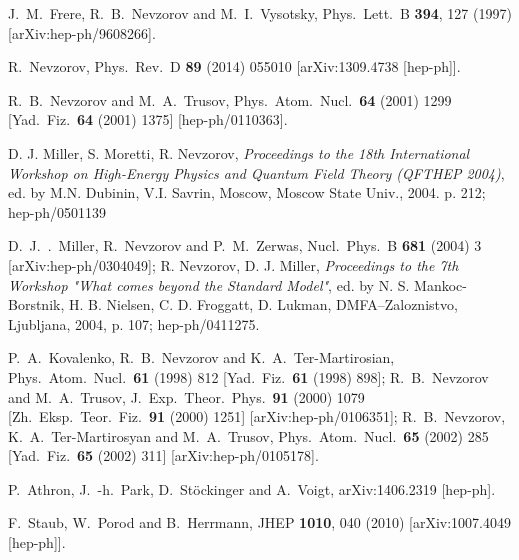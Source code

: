 \documentclass[12pt,a4paper]{article}
\begin{document}
\begin{thebibliography}{999}
J.~M.~Frere, R.~B.~Nevzorov and M.~I.~Vysotsky,
Phys.\ Lett.\  B {\bf 394}, 127 (1997)
[arXiv:hep-ph/9608266].

R.~Nevzorov,
Phys.\ Rev.\ D {\bf 89} (2014) 055010
[arXiv:1309.4738 [hep-ph]].

R.~B.~Nevzorov and M.~A.~Trusov,
Phys.\ Atom.\ Nucl.\  {\bf 64} (2001) 1299
[Yad.\ Fiz.\  {\bf 64} (2001) 1375]
[hep-ph/0110363].

D. J. Miller, S. Moretti, R. Nevzorov, {\it Proceedings to the 18th International
Workshop on High-Energy Physics and Quantum Field Theory (QFTHEP 2004)},
ed. by M.N. Dubinin, V.I. Savrin, Moscow, Moscow State Univ., 2004. p. 212; hep-ph/0501139

D.~J.~.~Miller, R.~Nevzorov and P.~M.~Zerwas,
Nucl.\ Phys.\  B {\bf 681} (2004) 3
[arXiv:hep-ph/0304049];
R. Nevzorov, D. J.  Miller, {\it Proceedings to the 7th Workshop "What comes beyond
the Standard Model"}, ed.  by N. S. Mankoc-Borstnik, H. B. Nielsen, C. D. Froggatt,
D. Lukman, DMFA--Zaloznistvo, Ljubljana, 2004, p. 107; hep-ph/0411275.

P.~A.~Kovalenko, R.~B.~Nevzorov and K.~A.~Ter-Martirosian,
Phys.\ Atom.\ Nucl.\  {\bf 61} (1998) 812
[Yad.\ Fiz.\  {\bf 61} (1998) 898];
R.~B.~Nevzorov and M.~A.~Trusov,
J.\ Exp.\ Theor.\ Phys.\  {\bf 91} (2000) 1079
[Zh.\ Eksp.\ Teor.\ Fiz.\  {\bf 91} (2000) 1251]
[arXiv:hep-ph/0106351];
R.~B.~Nevzorov, K.~A.~Ter-Martirosyan and M.~A.~Trusov,
Phys.\ Atom.\ Nucl.\  {\bf 65} (2002) 285
[Yad.\ Fiz.\  {\bf 65} (2002) 311]
[arXiv:hep-ph/0105178].

P.~Athron, J.~-h.~Park, D.~Stöckinger and A.~Voigt,
arXiv:1406.2319 [hep-ph].



  F.~Staub, W.~Porod and B.~Herrmann,
  JHEP {\bf 1010}, 040 (2010)
  [arXiv:1007.4049 [hep-ph]].


\end{thebibliography}
\end{document}
